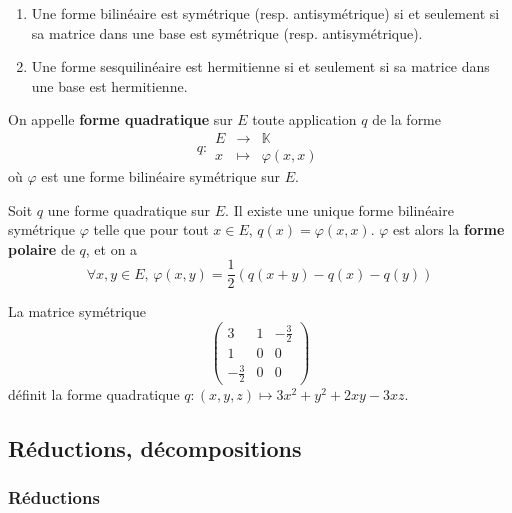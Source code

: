   \begin{proposition}
    \begin{enumerate}[label=(\roman*)]
      \item Une forme bilinéaire est symétrique (resp. antisymétrique) si et seulement si sa matrice dans une base est symétrique (resp. antisymétrique).
      \item Une forme sesquilinéaire est hermitienne si et seulement si sa matrice dans une base est hermitienne.
    \end{enumerate}
  \end{proposition}
  
  \begin{definition}
    On appelle \textbf{forme quadratique} sur $E$ toute application $q$ de la forme
    \[
    q :
    \begin{array}{ccc}
      E &\rightarrow& \mathbb{K} \\
      x &\mapsto& \varphi(x, x)
    \end{array}
    \]
    où $\varphi$ est une forme bilinéaire symétrique sur $E$.
  \end{definition}
  
  \begin{proposition}
    Soit $q$ une forme quadratique sur $E$. Il existe une unique forme bilinéaire symétrique $\varphi$ telle que pour tout $x \in E$, $q(x)=\varphi(x,x)$.
    \newpar
    $\varphi$ est alors la \textbf{forme polaire} de $q$, et on a
    \[ \forall x, y \in E, \, \varphi(x,y) = \frac{1}{2} (q(x+y) - q(x) - q(y)) \]
  \end{proposition}
  
  \begin{example}
    La matrice symétrique
    \[
      \begin{pmatrix}
        3 & 1 & -\frac{3}{2} \\
        1 & 0 & 0 \\
        -\frac{3}{2} & 0 & 0
      \end{pmatrix}
    \]
    définit la forme quadratique $q : (x, y, z) \mapsto 3x^2 + y^2 + 2xy - 3xz$.
  \end{example}
  
  \subsection{Réductions, décompositions}
  
  \subsubsection{Réductions}
  
